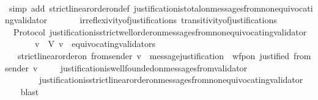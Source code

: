 \begin{isabellebody}
%
\isadelimproof
\ \ %
\endisadelimproof
%
\isatagproof
{}\isamarkupfalse%
\ {\isacharparenleft}simp\ add{\isacharcolon}\ strict{\isacharunderscore}linear{\isacharunderscore}order{\isacharunderscore}on{\isacharunderscore}def\ justification{\isacharunderscore}is{\isacharunderscore}total{\isacharunderscore}on{\isacharunderscore}messages{\isacharunderscore}from{\isacharunderscore}non{\isacharunderscore}equivocating{\isacharunderscore}validator\ \isanewline
\ \ \ \ \ \ irreflexivity{\isacharunderscore}of{\isacharunderscore}justifications\ transitivity{\isacharunderscore}of{\isacharunderscore}justifications{\isacharparenright}%
\endisatagproof
{\isafoldproof}%
%
\isadelimproof
\isanewline
%
\endisadelimproof
\isanewline
\isanewline
{}\isamarkupfalse%
\ {\isacharparenleft}\ Protocol{\isacharparenright}\ justification{\isacharunderscore}is{\isacharunderscore}strict{\isacharunderscore}well{\isacharunderscore}order{\isacharunderscore}on{\isacharunderscore}messages{\isacharunderscore}from{\isacharunderscore}non{\isacharunderscore}equivocating{\isacharunderscore}validator{\isacharcolon}\isanewline
\ \ {\isachardoublequoteopen}{\isasymforall}\ {\isasymsigma}\ {\isasymin}\ {\isasymSigma}{\isachardot}\ {\isacharparenleft}{\isasymforall}\ v\ {\isasymin}\ V{\isachardot}\ v\ {\isasymnotin}\ equivocating{\isacharunderscore}validators\ {\isasymsigma}\ \isanewline
\ \ {\isasymlongrightarrow}\ strict{\isacharunderscore}linear{\isacharunderscore}order{\isacharunderscore}on\ {\isacharparenleft}from{\isacharunderscore}sender\ {\isacharparenleft}v{\isacharcomma}\ {\isasymsigma}{\isacharparenright}{\isacharparenright}\ message{\isacharunderscore}justification\ {\isasymand}\ wfp{\isacharunderscore}on\ justified\ {\isacharparenleft}from{\isacharunderscore}sender\ {\isacharparenleft}v{\isacharcomma}\ {\isasymsigma}{\isacharparenright}{\isacharparenright}{\isacharparenright}{\isachardoublequoteclose}\isanewline
%
\isadelimproof
\ \ %
\endisadelimproof
%
\isatagproof
{}\isamarkupfalse%
\ justification{\isacharunderscore}is{\isacharunderscore}well{\isacharunderscore}founded{\isacharunderscore}on{\isacharunderscore}messages{\isacharunderscore}from{\isacharunderscore}validator\isanewline
\ \ \ \ \ \ \ \ justification{\isacharunderscore}is{\isacharunderscore}strict{\isacharunderscore}linear{\isacharunderscore}order{\isacharunderscore}on{\isacharunderscore}messages{\isacharunderscore}from{\isacharunderscore}non{\isacharunderscore}equivocating{\isacharunderscore}validator\ \isanewline
\ \ \isamarkupfalse%
\ blast%
\endisatagproof

\end{isabellebody}
